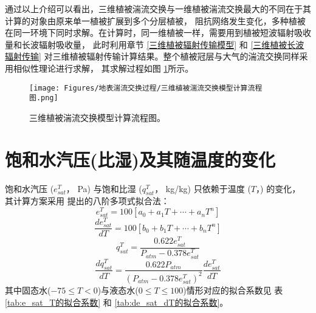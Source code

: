 通过以上介绍可以看出，三维植被湍流交换与一维植被湍流交换最大的不同在于其计算的对象由原来单一植被扩展到多个分层植被，
阻抗网络发生变化，多种植被在同一环境下同时求解。在计算时，同一维植被一样，需要用到植被短波辐射吸收量和长波辐射吸收量，
此时利用章节 \ref{三维植被辐射传输模型} 和 \ref{三维植被长波辐射传输} 对三维植被辐射传输计算结果。整个植被冠层与大气的湍流交换同样采用相似性理论进行求解，
其求解过程如图 \ref{fig:三维植被湍流交换模型计算流程图}所示。
{
\begin{figure}[]
\centering
\texttt{[image: Figures/地表湍流交换过程/三维植被湍流交换模型计算流程图.png]}
\caption{三维植被湍流交换模型计算流程图。}
\label{fig:三维植被湍流交换模型计算流程图}
\end{figure}
}




\section{饱和水汽压(比湿)及其随温度的变化}\label{饱和水汽压(比湿)及其随温度的变化}
饱和水汽压 ($e_{sat}^T$， Pa) 与饱和比湿 ($q_{sat}^T$， kg/kg) 只依赖于温度 ($T$，\textcelsius) 的变化，
其计算方案采用\citet{flatau1992polynomial} 提出的八阶多项式拟合法：
\begin{equation}
e_{s a t}^{T}=100\left[a_{0}+a_{1} T+\cdots+a_{n} T^{n}\right]
\end{equation}
\begin{equation}
\frac{d e_{s a t}^{T}}{d T}=100\left[b_{0}+b_{1} T+\cdots+b_{n} T^{n}\right]
\end{equation}
\begin{equation}
q_{s a t}^{T}=\frac{0.622 e_{s a t}^{T}}{P_{atm}-0.378 e_{s a t}^{T}}
\end{equation}
\begin{equation}
\frac{d q_{{sat }}^{T}}{d T}=\frac{0.622 P_{atm}}{\left(P_{atm}-0.378 e_{{sat }}^{T}\right)^{2}} \frac{d e_{{sat }}^{T}}{d T}
\end{equation}
其中固态水($-75$\textcelsius$\le T<0$\textcelsius)与液态水($0$\textcelsius $\le T\le100$\textcelsius)情形对应的拟合系数见
表 \ref{tab:e_sat_T的拟合系数} 和 \ref{tab:de_sat_dT的拟合系数}。
